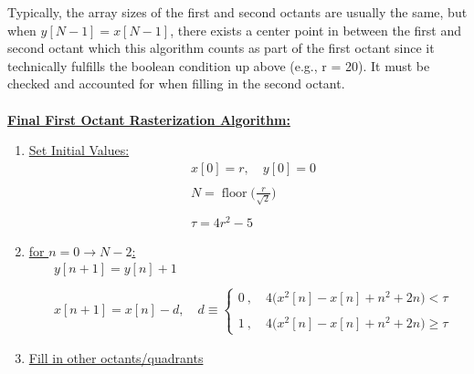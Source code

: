 \documentclass{article}
\DeclareMathOperator{\floor}{floor}
\begin{document}
Typically, the array sizes of the first and second octants are usually the same, but when $y[N - 1] = x[N - 1]$,
there exists a center point in between the first and second octant which this algorithm counts as part of the first
octant since it technically fulfills the boolean condition up above (e.g., r = 20). It must be checked and accounted for when filling
in the second octant. \\ \\

\underline{\textbf{Final First Octant Rasterization Algorithm:}} \\
\begin{enumerate}
    \item \underline{Set Initial Values:} 
          \begin{align*}
                &x[0] = r, \quad y[0] = 0 \\ \\
                &N = \floor\Bigg(\frac{r}{\sqrt{2}}\Bigg) \\ \\
                &\tau = 4r^{2} - 5
            \end{align*}
    \item \underline{for $n = 0 \rightarrow N - 2$:} \\
          \begin{align*}
            &y[n + 1] = y[n] + 1 \\ \\
            &x[n + 1] = x[n] - d, \quad d \equiv \begin{cases}
                                                     0 \ , \quad 4\Big(x^{2}[n] - x[n] + n^{2} + 2n\Big) < \tau \\ \\
                                                     1 \ , \quad 4\Big(x^{2}[n] - x[n] + n^{2} + 2n\Big) \geq \tau
                                                   \end{cases}
          \end{align*}
    \item \underline{Fill in other octants/quadrants} \\ \\


\end{enumerate}
\end{document}
